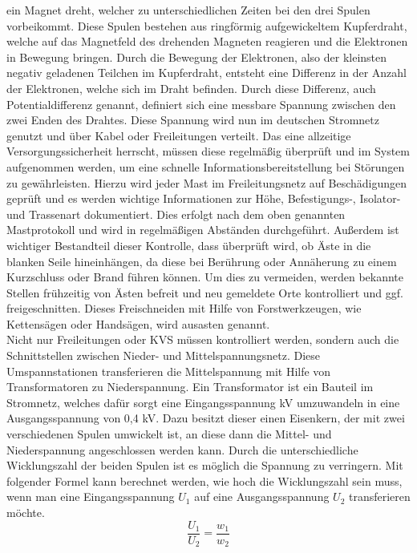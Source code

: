 ein Magnet dreht, welcher zu unterschiedlichen Zeiten bei den drei Spulen vorbeikommt. Diese Spulen bestehen aus ringförmig aufgewickeltem Kupferdraht, welche 
auf das Magnetfeld des drehenden Magneten reagieren und die Elektronen in Bewegung bringen. Durch die Bewegung der Elektronen, also der kleinsten negativ 
geladenen Teilchen im Kupferdraht, entsteht eine Differenz in der Anzahl der Elektronen, welche sich im Draht befinden. Durch diese Differenz, auch 
Potentialdifferenz genannt, definiert sich eine messbare Spannung zwischen den zwei Enden des Drahtes. Diese Spannung wird nun im deutschen Stromnetz genutzt 
und über Kabel oder Freileitungen verteilt. Das eine allzeitige Versorgungssicherheit herrscht, müssen diese regelmäßig überprüft und im System aufgenommen 
werden, um eine schnelle Informationsbereitstellung bei Störungen zu gewährleisten. Hierzu wird jeder Mast im Freileitungsnetz auf Beschädigungen geprüft und 
es werden wichtige Informationen zur Höhe, Befestigungs-, Isolator- und Trassenart dokumentiert. Dies erfolgt nach dem oben genannten Mastprotokoll und wird 
in regelmäßigen Abständen durchgeführt. Außerdem ist wichtiger Bestandteil dieser Kontrolle, dass überprüft wird, ob Äste in die blanken Seile hineinhängen, 
da diese bei Berührung oder Annäherung zu einem Kurzschluss oder Brand führen können. Um dies zu vermeiden, werden bekannte Stellen frühzeitig von Ästen 
befreit und neu gemeldete Orte kontrolliert und ggf. freigeschnitten. Dieses Freischneiden mit Hilfe von Forstwerkzeugen, wie Kettensägen oder Handsägen, 
wird ausasten genannt.
\\
Nicht nur Freileitungen oder KVS müssen kontrolliert werden, sondern auch die Schnittstellen zwischen Nieder- und Mittelspannungsnetz. Diese Umspannstationen 
transferieren die Mittelspannung mit Hilfe von Transformatoren zu Niederspannung. Ein Transformator ist ein Bauteil im Stromnetz, welches dafür sorgt eine 
Eingangsspannung  kV umzuwandeln in eine Ausgangsspannung von 0,4 kV. Dazu besitzt dieser einen Eisenkern, der mit zwei verschiedenen Spulen 
umwickelt ist, an diese dann die Mittel- und Niederspannung angeschlossen werden kann. Durch die unterschiedliche Wicklungszahl der beiden Spulen ist 
es möglich die Spannung zu verringern. Mit folgender Formel kann berechnet werden, wie hoch die Wicklungszahl sein muss, wenn man \zB eine 
Eingangsspannung $U_1$ auf eine Ausgangsspannung $U_2$ transferieren möchte. 
\begin{equation}
\frac{U_1}{U_2}=\frac{w_1}{w_2}
\label{eqn:Transformator Wicklungszahl}
\end{equation}
